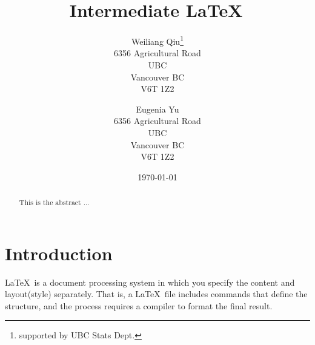 \documentclass[12pt]{article}
\begin{document}

\title{ \vspace{1.5in} Intermediate \LaTeX\,} %

\author{Weiliang Qiu\thanks{supported by UBC Stats Dept.}\\6356 Agricultural Road\\
        UBC \\
        Vancouver BC \\
        V6T 1Z2 
        \and Eugenia Yu \\ 
        6356 Agricultural Road\\
        UBC \\
        Vancouver BC \\
        V6T 1Z2}

\date{\today}
\maketitle



\thispagestyle{empty} 

\setcounter{page}{0}            
\newpage

\tableofcontents  %
\listoffigures %
\listoftables %

\newpage %

\begin{abstract}
This is the abstract ...
\end{abstract}


\section{Introduction}
\LaTeX\, is a document processing system in which you specify the content
and layout(style) separately. That is, a \LaTeX\, file includes commands that
define the structure, and the process requires a compiler to format the final
result.
\end{document}
